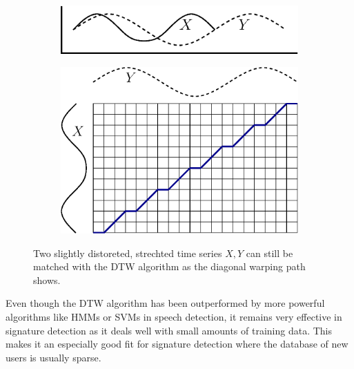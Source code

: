 \documentclass[a4paper, oneside]{csthesis}
\begin{document}
\begin{figure}
        \centering
        \begin{subfigure}[b]{0.45\textwidth}
                \centering
                \includegraphics[width=\textwidth]{figures/dtw-graphic1.eps}
                \label{fig:hmm1}
        \end{subfigure}%
        \quad
        \begin{subfigure}[b]{0.45\textwidth}
                \centering
                \includegraphics[width=\textwidth]{figures/dtw-graphic2.eps}
                \label{fig:hmm1}
        \end{subfigure}%

        \caption{Two slightly distoreted, strechted time series $X,Y$ can still be matched with the DTW algorithm as the diagonal warping path shows.}
        \label{fig:dtw-matrix}
\end{figure}



Even though the DTW algorithm has been outperformed by more powerful algorithms like HMMs or SVMs in speech detection, it remains very effective in signature detection as it deals well with small amounts of training data. This makes it an especially good fit for signature detection where the database of new users is usually sparse.
\end{document}
